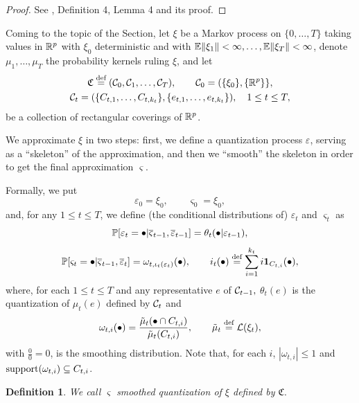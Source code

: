 \documentclass{article}              %
\newtheorem{definition}{Definition}
\begin{document}
\begin{proof}
See \cite{Smid09c}, Definition 4, Lemma 4 and its proof. 
\end{proof}

\noindent Coming to the topic of the Section, let $\xi$ be a Markov process
on $\{0,\dots,T\}$ taking values in $\mathbb{R}^{p}$ with $\xi_{0}$ deterministic
and with $\mathbb{E}\|\xi_{1}\|<\infty,\dots,\mathbb{E}\|\xi_{T}\|<\infty$, denote $\mu_{1},\dots,\mu_{T}$
the probability kernels ruling $\xi$, and let
\begin{multline*}
\mathfrak{C}\stackrel{\text{\rm def}}{=}(\mathcal{C}_{0},\mathcal{C}_{1},\dots,\mathcal{C}_{T}),\qquad\mathcal{C}_{0}=(\{\xi_{0}\},\{\mathbb{R}^{p}\}\},\\
\mathcal{C}_{t}=(\{C_{t,1},\dots,C_{t,k_{t}}\},\{e_{t,1},\dots,e_{t,k_{t}}\}),\quad1\leq t\leq T,
\end{multline*}
be a collection of rectangular coverings of $\mathbb{R}^{p}$. 

We approximate $\xi$ in two steps: first, we define a quantization
process $\varepsilon$, serving as a ``skeleton'' of the approximation,
and then we ``smooth'' the skeleton in order to get the final approximation
$\varsigma$. 

Formally, we put
\[
\varepsilon_{0}=\xi_{0},\qquad\varsigma_{0}=\xi_{0},
\]
and, for any $1\leq t\leq T$, we define (the conditional distributions of) $\varepsilon_t$ and $\varsigma_t$ as  
\begin{equation}
\mathbb{P}[\varepsilon_{t}=\bullet|\overline{\varsigma}_{t-1},\overline{\varepsilon}_{t-1}]=\theta_{t}(\bullet|\varepsilon_{t-1}),\label{eq:skelet}
\end{equation}
\begin{equation}
\mathbb{P}[\varsigma_{t}=\bullet|\overline{\varsigma}_{t-1},\overline{\varepsilon}_{t}]=\omega_{t,\iota_{t}(\varepsilon_{t})}(\bullet),\qquad i_{t}(\bullet)\stackrel{\text{\rm def}}{=}\sum_{i=1}^{k_{t}}i\mathbf{1}_{C_{t,i}}(\bullet),\label{eq:vsdef}
\end{equation}
where, for each $1\leq t\leq T$ and any representative $e$ of $\mathcal{C}_{t-1},$
$\theta_{t}(e)$ is the quantization of $\mu_{t}(e)$ defined by $\mathcal{C}_{t}$
and 
\[
\omega_{t,i}(\bullet)=\frac{\tilde{\mu}_{t}(\bullet\cap C_{t,i})}{\tilde{\mu}_{t}(C_{t,i})},\qquad\tilde{\mu}_{t}\stackrel{\text{\rm def}}{=}\mathcal{L}(\xi_{t}),
\]
with $\frac{0}{0}=0$, is the smoothing distribution. Note that, for each $i$, $|\omega_{t,i}|\leq1$
and $\mathrm{support}(\omega_{t,i})\subseteq C_{t,i}$. 

\begin{definition}
We call $\varsigma$ \emph{smoothed quantization of $\xi$ defined
by $\mathfrak{C}.$}
\end{definition}
\end{document}
